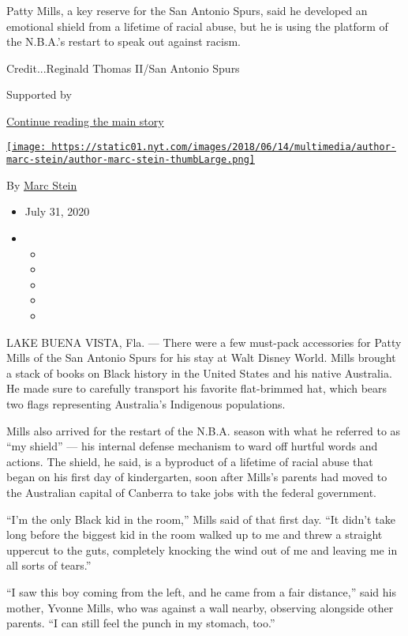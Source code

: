 Patty Mills, a key reserve for the San Antonio Spurs, said he developed
an emotional shield from a lifetime of racial abuse, but he is using the
platform of the N.B.A.'s restart to speak out against racism.

Credit...Reginald Thomas II/San Antonio Spurs

Supported by

\protect\hyperlink{after-sponsor}{Continue reading the main story}

\href{https://www.nytimes.com/by/marc-stein}{\texttt{[image: https://static01.nyt.com/images/2018/06/14/multimedia/author-marc-stein/author-marc-stein-thumbLarge.png]}}

By \href{https://www.nytimes.com/by/marc-stein}{Marc Stein}

\begin{itemize}
\item
  July 31, 2020
\item
  \begin{itemize}
  \item
  \item
  \item
  \item
  \item
  \end{itemize}
\end{itemize}

LAKE BUENA VISTA, Fla. --- There were a few must-pack accessories for
Patty Mills of the San Antonio Spurs for his stay at Walt Disney World.
Mills brought a stack of books on Black history in the United States and
his native Australia. He made sure to carefully transport his favorite
flat-brimmed hat, which bears two flags representing Australia's
Indigenous populations.

Mills also arrived for the restart of the N.B.A. season with what he
referred to as ``my shield'' --- his internal defense mechanism to ward
off hurtful words and actions. The shield, he said, is a byproduct of a
lifetime of racial abuse that began on his first day of kindergarten,
soon after Mills's parents had moved to the Australian capital of
Canberra to take jobs with the federal government.

``I'm the only Black kid in the room,'' Mills said of that first day.
``It didn't take long before the biggest kid in the room walked up to me
and threw a straight uppercut to the guts, completely knocking the wind
out of me and leaving me in all sorts of tears.''

``I saw this boy coming from the left, and he came from a fair
distance,'' said his mother, Yvonne Mills, who was against a wall
nearby, observing alongside other parents. ``I can still feel the punch
in my stomach, too.''

